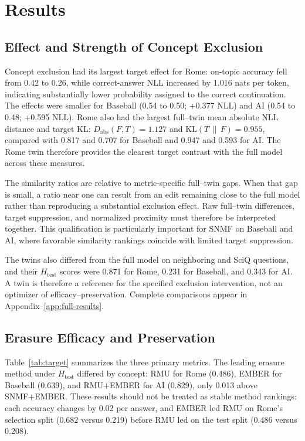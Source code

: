 \section{Results}
\label{sec:results}

\subsection{Effect and Strength of Concept Exclusion}

Concept exclusion had its largest target effect for Rome: on-topic accuracy fell from
0.42 to 0.26, while correct-answer NLL increased by 1.016 nats per token,
indicating substantially lower probability assigned to the correct continuation. The
effects were smaller for Baseball (0.54 to 0.50; +0.377 NLL) and AI (0.54 to
0.48; +0.595 NLL). Rome also had the largest full--twin mean absolute NLL
distance and target KL: $D_{\mathrm{abs}}(F,T)=1.127$ and
$\mathrm{KL}(T\,\|\,F)=0.955$, compared with 0.817 and 0.707 for Baseball and
0.947 and 0.593 for AI. The Rome twin therefore provides the clearest target
contrast with the full model across these measures.

The similarity ratios are relative to metric-specific full--twin gaps. When
that gap is small, a ratio near one can result from an edit remaining close to
the full model rather than reproducing a substantial exclusion effect. Raw
full--twin differences, target suppression, and normalized proximity must
therefore be interpreted together. This qualification is particularly
important for SNMF on Baseball and AI, where favorable similarity rankings
coincide with limited target suppression.

The twins also differed from the full model on neighboring and SciQ questions,
and their $H_{\mathrm{test}}$ scores were 0.871 for Rome, 0.231 for Baseball,
and 0.343 for AI. A twin is therefore a reference for the specified exclusion
intervention, not an optimizer of efficacy--preservation. Complete comparisons
appear in Appendix~\ref{app:full-results}.

\subsection{Erasure Efficacy and Preservation}

Table~\ref{tab:target} summarizes the three primary metrics. The leading erasure
method under $H_{\mathrm{test}}$ differed by concept: RMU for Rome (0.486),
EMBER for Baseball (0.639), and RMU+EMBER for AI (0.829), only 0.013 above
SNMF+EMBER. These results should not be treated as stable method rankings:
each accuracy changes by 0.02 per answer, and EMBER led RMU on Rome's
selection split (0.682 versus 0.219) before RMU led on the test split (0.486
versus 0.208).


